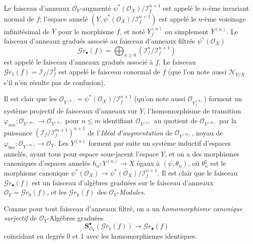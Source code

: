 \begin{definition}[16.1.2]
Le faisceau d'anneaux $\mathcal{O}_Y$-augmenté
$\psi^*(\mathcal{O}_X)/\mathscr{I}_f^{n+1}$ est appelé le $n$-ème \textup{invariant normal}
de $f$; l'espace annelé
$(Y,\psi^*(\mathcal{O}_X)/\mathscr{I}_f^{n+1})$ est appelé le $n$-ème \textup{voisinage
infinitésimal de} $Y$ pour le morphisme $f$, et noté $Y_f^{(n)}$ ou simplement
$Y^{(n)}$. Le faisceau d'anneaux gradués associé au faisceau d'anneaux filtrés
$\psi^*(\mathcal{O}_X)$
\[
  \mathscr{G}r_\bullet(f)=\bigoplus_{n\geq 0}
  (\mathscr{I}_f^n/\mathscr{I}_f^{n+1})
  \tag{16.1.2.1}
  \label{IV.16.1.2.1}
\]
est appelé le faisceau d'anneaux gradués \textup{associé à} $f$. Le faisceau
$\mathscr{G}r_1(f)=\mathscr{I}_f/\mathscr{I}_f^2$ est appelé le \textup{faisceau conormal}
de $f$ \textup{(que l'on note aussi $\mathscr{N}_{Y/X}$ s'il n'en résulte pas de confusion)}.
\end{definition}

Il est clair que les
$\mathcal{O}_{Y^{(n)}}=\psi^*(\mathcal{O}_X)/\mathscr{I}_f^{n+1}$
(qu'on note aussi $\mathcal{O}_{Y_f^{(n)}}$) forment un
système projectif de faisceaux d'anneaux sur $Y$, l'homomorphisme de transition
$\varphi_{nm}:\mathcal{O}_{Y^{(m)}}\to\mathcal{O}_{Y^{(n)}}$ pour $n\leq m$
identifiant $\mathcal{O}_{Y^{(n)}}$ au quotient de $\mathcal{O}_{Y^{(m)}}$ par la
puissance $(\mathscr{I}_f/\mathscr{I}_f^{m+1})^{n+1}$ de l'\emph{Idéal d'augmentation} de
$\mathcal{O}_{Y^{(m)}}$, noyau de
$\varphi_{0m}:\mathcal{O}_{Y^{(m)}}\to\mathcal{O}_Y$. Les $Y^{(n)}$ forment par
suite un système inductif d'espaces annelés, ayant tous pour espace sous-jacent
l'espace $Y$, et on a des morphismes canoniques d'espaces annelés
$h_n:Y^{(n)}\to X$ égaux à $(\psi,\theta_n)$, où $\theta_n^\sharp$ est le morphisme
canonique
$\psi^*(\mathcal{O}_X)\to\psi^*(\mathcal{O}_X)/\mathscr{I}_f^{n+1}$.
Il est clair que le faisceau $\mathscr{G}r_\bullet(f)$ est un faisceau d'algèbres
graduées sur le faisceau d'anneaux
$\mathcal{O}_Y=\mathscr{G}r_0(f)$, et les $\mathscr{G}r_k(f)$ des
$\mathcal{O}_Y$-\emph{Modules}.

Comme pour tout faisceau d'anneaux filtré, on a un \emph{homomorphisme canonique
surjectif} de $\mathcal{O}_Y$-Algèbres graduées
\[
  \mathbf{S}_{\mathcal{O}_Y}^{\bullet}(\mathscr{G}r_1(f))
  \longrightarrow\mathscr{G}r_\bullet(f)
  \tag{16.1.2.2}
  \label{IV.16.1.2.2}
\]
coïncidant en degrés 0 et 1 avec les homomorphismes identiques.

